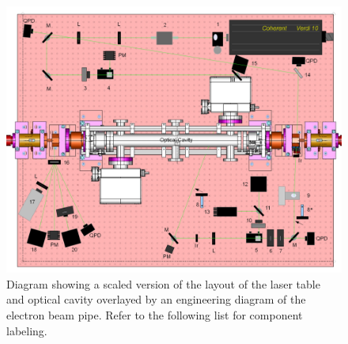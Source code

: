 \newpage
\begin{figure}
\begin{center}
\includegraphics[width=6in]{./Pictures/tablelayoutwnmb.png}
\caption{Diagram showing a scaled version of the layout of the laser table and optical cavity overlayed by an engineering diagram of the electron beam pipe. Refer to the following list for component labeling.}
\label{fig:tablelayout}
\end{center}
\end{figure}
